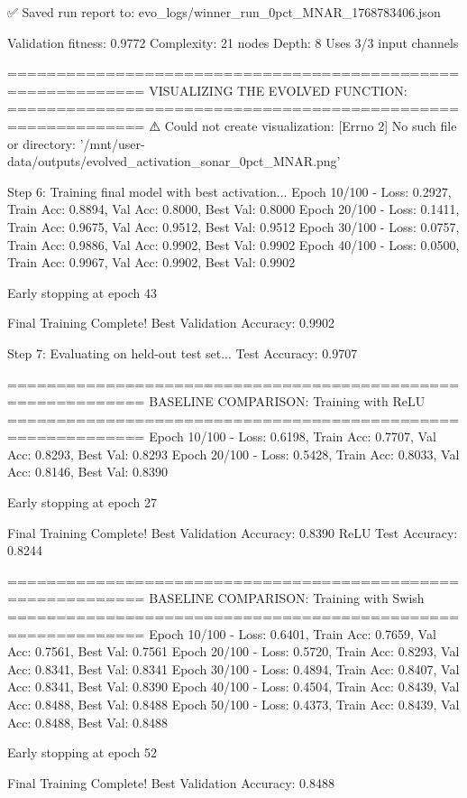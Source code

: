 ✅ Saved run report to: evo_logs/winner_run_0pct_MNAR_1768783406.json

Validation fitness: 0.9772
Complexity: 21 nodes
Depth: 8
Uses 3/3 input channels

============================================================
VISUALIZING THE EVOLVED FUNCTION:
============================================================
⚠️ Could not create visualization: [Errno 2] No such file or directory: '/mnt/user-data/outputs/evolved_activation_sonar_0pct_MNAR.png'

Step 6: Training final model with best activation...
Epoch  10/100 - Loss: 0.2927, Train Acc: 0.8894, Val Acc: 0.8000, Best Val: 0.8000
Epoch  20/100 - Loss: 0.1411, Train Acc: 0.9675, Val Acc: 0.9512, Best Val: 0.9512
Epoch  30/100 - Loss: 0.0757, Train Acc: 0.9886, Val Acc: 0.9902, Best Val: 0.9902
Epoch  40/100 - Loss: 0.0500, Train Acc: 0.9967, Val Acc: 0.9902, Best Val: 0.9902

Early stopping at epoch 43

Final Training Complete!
Best Validation Accuracy: 0.9902

Step 7: Evaluating on held-out test set...
Test Accuracy: 0.9707

============================================================
BASELINE COMPARISON: Training with ReLU
============================================================
Epoch  10/100 - Loss: 0.6198, Train Acc: 0.7707, Val Acc: 0.8293, Best Val: 0.8293
Epoch  20/100 - Loss: 0.5428, Train Acc: 0.8033, Val Acc: 0.8146, Best Val: 0.8390

Early stopping at epoch 27

Final Training Complete!
Best Validation Accuracy: 0.8390
ReLU Test Accuracy: 0.8244

============================================================
BASELINE COMPARISON: Training with Swish
============================================================
Epoch  10/100 - Loss: 0.6401, Train Acc: 0.7659, Val Acc: 0.7561, Best Val: 0.7561
Epoch  20/100 - Loss: 0.5720, Train Acc: 0.8293, Val Acc: 0.8341, Best Val: 0.8341
Epoch  30/100 - Loss: 0.4894, Train Acc: 0.8407, Val Acc: 0.8341, Best Val: 0.8390
Epoch  40/100 - Loss: 0.4504, Train Acc: 0.8439, Val Acc: 0.8488, Best Val: 0.8488
Epoch  50/100 - Loss: 0.4373, Train Acc: 0.8439, Val Acc: 0.8488, Best Val: 0.8488

Early stopping at epoch 52

Final Training Complete!
Best Validation Accuracy: 0.8488

